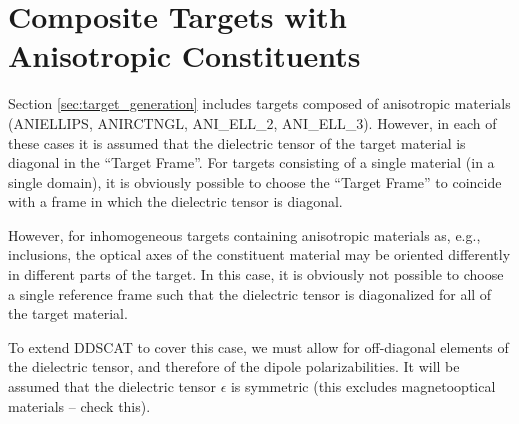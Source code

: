 

\section{Composite Targets with Anisotropic Constituents
         \label{sec:composite anisotropic targets}}

Section \ref{sec:target_generation} includes
targets composed of anisotropic materials
(ANIELLIPS, ANIRCTNGL, ANI\_ELL\_2, ANI\_ELL\_3).
However, in each of these cases it is assumed that the dielectric tensor
of the target material is diagonal in the 
``Target Frame''.  For targets
consisting of a single material (in a single domain), it is obviously possible
to choose the ``Target Frame'' to coincide with a frame in which the
dielectric tensor is diagonal.

However, for inhomogeneous targets containing anisotropic materials as,
e.g., inclusions, the optical axes of the constituent material may be
oriented differently in different parts of the target.  In this case,
it is obviously not possible to choose a single reference frame such that
the dielectric tensor is diagonalized for all of the target material.

To extend DDSCAT to cover this case, we must allow for off-diagonal elements
of the dielectric tensor, and therefore of the dipole polarizabilities.
It will be assumed that the dielectric tensor $\epsilon$ is symmetric
(this excludes magnetooptical materials -- check this).

